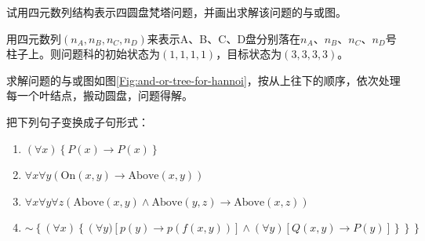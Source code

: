 \begin{question}
试用四元数列结构表示四圆盘梵塔问题，并画出求解该问题的与或图。
\end{question}
\begin{solution}
用四元数列$(n_A, n_B, n_C, n_D)$来表示A、B、C、D盘分别落在$n_A$、$n_B$、$n_C$、$n_D$号柱子上。则问题科的初始状态为$(1,1,1,1)$，目标状态为$(3,3,3,3)$。\par
求解问题的与或图如图\ref{Fig:and-or-tree-for-hannoi}，按从上往下的顺序，依次处理每一个叶结点，搬动圆盘，问题得解。
\end{solution}

\begin{question}
把下列句子变换成子句形式：
	\begin{enumerate}
         \item $\left(\forall x\right) \left\{P\left(x\right) \to P\left(x\right)\right\}$
         \item $\forall x \forall y \left(\mathrm{On} \left(x,y\right) \to \mathrm{Above} \left(x,y\right) \right)$
         \item $\forall x \forall y \forall z \left(\mathrm{Above} \left(x,y\right) \wedge \mathrm{Above}\left(y,z\right) \to \mathrm{Above}\left(x,z\right) \right)$ 
         \item $\sim\left\{\left(\forall x\right)\left\{\left(\forall y)\left[p\left(y\right) \to p(f(x,y))\right] \wedge \left(\forall y \right) \left[Q(x,y) \to P(y) \right]\right\}\right\}\right\}$
	\end{enumerate}
\end{question}
